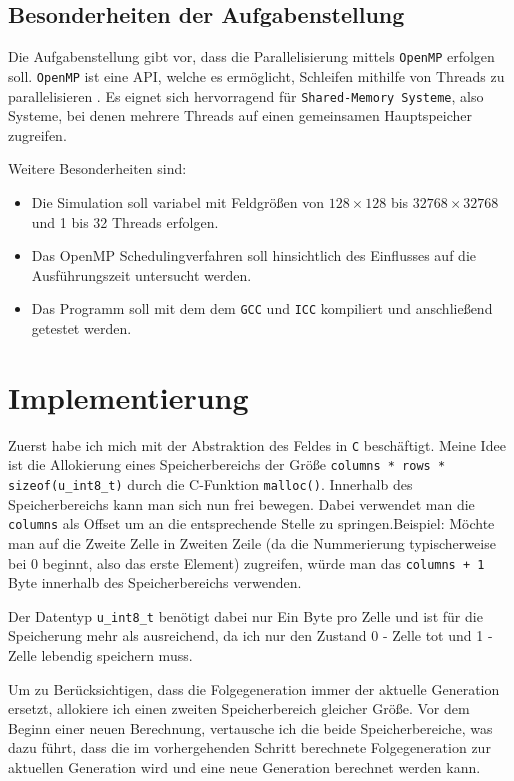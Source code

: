 \documentclass[german,plainarticle,hyperref,utf8]{zihpub}
\begin{document}
	\subsection{Besonderheiten der Aufgabenstellung}
	Die Aufgabenstellung gibt vor, dass die Parallelisierung mittels \texttt{OpenMP} erfolgen soll. \texttt{OpenMP} ist eine API, welche es ermöglicht, Schleifen mithilfe von Threads zu parallelisieren \cite{openmp}. Es eignet sich hervorragend für \texttt{Shared-Memory Systeme}, also Systeme, bei denen mehrere Threads auf einen gemeinsamen Hauptspeicher zugreifen.
	
	Weitere Besonderheiten sind:
	\begin{itemize}
		\item Die Simulation soll variabel mit Feldgrößen von $128\times 128$ bis $32768\times 32768$ und 1 bis 32 Threads erfolgen.
		\item Das OpenMP Schedulingverfahren soll hinsichtlich des Einflusses auf die Ausführungszeit untersucht werden.
		\item Das Programm soll mit dem dem \texttt{GCC} und \texttt{ICC} kompiliert und anschließend getestet werden.
	\end{itemize}

	\section{Implementierung}
	 Zuerst habe ich mich mit der Abstraktion des Feldes in \texttt{C} beschäftigt. Meine Idee ist die Allokierung eines Speicherbereichs der Größe \texttt{columns * rows * sizeof(u\_int8\_t)} durch die C-Funktion \texttt{malloc()}. Innerhalb des Speicherbereichs kann man sich nun frei bewegen. Dabei verwendet man die \texttt{columns} als Offset um an die entsprechende Stelle zu springen.Beispiel: Möchte man auf die Zweite Zelle in Zweiten Zeile (da die Nummerierung typischerweise bei 0 beginnt, also das erste Element) zugreifen, würde man das \texttt{columns + 1} Byte innerhalb des Speicherbereichs verwenden.
	 
	 Der Datentyp \texttt{u\_int8\_t} benötigt dabei nur Ein Byte pro Zelle und ist für die Speicherung mehr als ausreichend, da ich nur den Zustand 0 - Zelle tot und 1 - Zelle lebendig speichern muss.
	 
	 Um zu Berücksichtigen, dass die Folgegeneration immer der aktuelle Generation ersetzt, allokiere ich einen zweiten Speicherbereich gleicher Größe. Vor dem Beginn einer neuen Berechnung, vertausche ich die beide Speicherbereiche, was dazu führt, dass die im vorhergehenden Schritt berechnete Folgegeneration zur aktuellen Generation wird und eine neue Generation berechnet werden kann.
	
\end{document}
